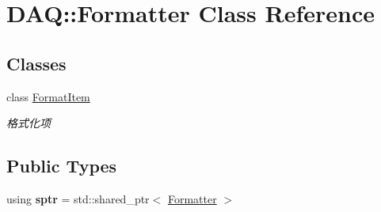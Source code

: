 \hypertarget{classDAQ_1_1Formatter}{}\section{D\+AQ\+:\+:Formatter Class Reference}
\label{classDAQ_1_1Formatter}
\subsection*{Classes}
\begin{DoxyCompactItemize}
\item 
class \hyperlink{classDAQ_1_1Formatter_1_1FormatItem}{Format\+Item}
\begin{DoxyCompactList}\small\item\em 格式化项 \end{DoxyCompactList}\end{DoxyCompactItemize}
\subsection*{Public Types}
\begin{DoxyCompactItemize}
\item 
\mbox{\label{classDAQ_1_1Formatter_a7a4cdf5a5a9ef4a7e42e659009d1136a}} 
using {\bfseries sptr} = std\+::shared\+\_\+ptr$<$ \hyperlink{classDAQ_1_1Formatter}{Formatter} $>$
\end{DoxyCompactItemize}
